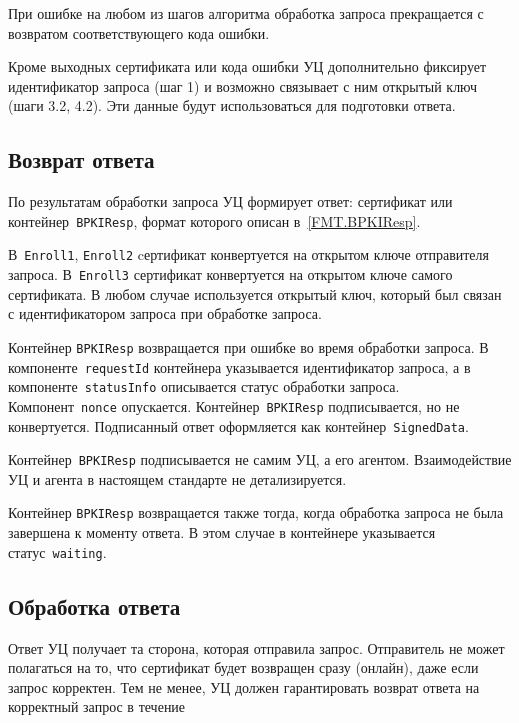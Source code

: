 При ошибке на любом из шагов алгоритма обработка запроса 
прекращается с возвратом соответствующего кода ошибки.

Кроме выходных сертификата или кода ошибки 
УЦ дополнительно фиксирует идентификатор запроса (шаг 1)
и возможно связывает с ним открытый ключ (шаги 3.2, 4.2). 
Эти данные будут использоваться для подготовки ответа.


\subsection{Возврат ответа}\label{PROCESSES.Enroll.Resp}

По результатам обработки запроса УЦ формирует ответ: сертификат или 
контейнер~\texttt{BPKIResp}, формат которого описан в~\ref{FMT.BPKIResp}. 

В~\texttt{Enroll1}, \texttt{Enroll2} cертификат конвертуется на открытом 
ключе отправителя запроса. В~\texttt{Enroll3} сертификат конвертуется на 
открытом ключе самого сертификата.
%
В любом случае используется открытый ключ, который был связан с 
идентификатором запроса при обработке запроса.

Контейнер \texttt{BPKIResp} возвращается при ошибке во время обработки
запроса. В компоненте~\texttt{requestId} контейнера указывается идентификатор 
запроса, а в компоненте~\texttt{statusInfo} описывается статус обработки 
запроса. Компонент~\texttt{nonce} опускается.
%
Контейнер~\texttt{BPKIResp} подписывается, но не конвертуется.
%
Подписанный ответ оформляется как контейнер~\texttt{SignedData}.

Контейнер~\texttt{BPKIResp} подписывается не самим УЦ, 
а его агентом. Взаимодействие УЦ и агента в настоящем стандарте не 
детализируется.

Контейнер \texttt{BPKIResp} возвращается также тогда,
когда обработка запроса не была завершена к моменту ответа.
В этом случае в контейнере указывается статус~\texttt{waiting}.

\subsection{Обработка ответа}\label{PROCESSES.Enroll.Finish}

Ответ УЦ получает та сторона, которая отправила запрос.
Отправитель не может полагаться на то, что сертификат
будет возвращен сразу (онлайн), даже если запрос корректен.
%
Тем не менее, УЦ должен гарантировать возврат ответа на корректный запрос  
в течение  

